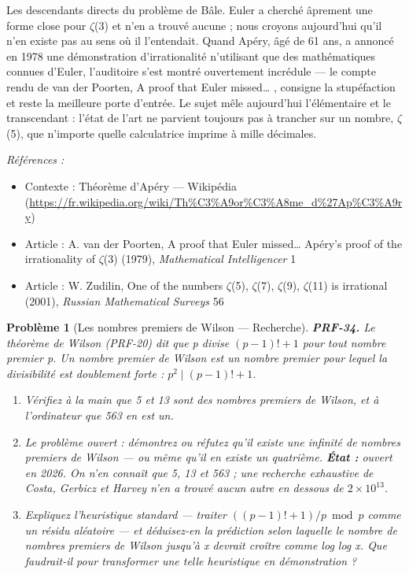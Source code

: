 \documentclass[11pt]{article}
\newtheorem{problem}{Problème}
\newenvironment{refs}{\par\small\noindent\emph{Références :}\begin{itemize}\setlength\itemsep{0pt}}{\end{itemize}\normalsize}
\begin{document}
\noindent Les descendants directs du problème de Bâle. Euler a cherché âprement une
forme close pour $\zeta$(3) et n'en a trouvé aucune ; nous croyons aujourd'hui qu'il n'en existe
pas au sens où il l'entendait. Quand Apéry, âgé de 61 ans, a annoncé en 1978 une
démonstration d'irrationalité n'utilisant que des mathématiques connues d'Euler, l'auditoire
s'est montré ouvertement incrédule --- le compte rendu de van der Poorten, \og{} A proof that
Euler missed\dots{} \fg{}, consigne la stupéfaction et reste la meilleure porte d'entrée. Le sujet mêle
aujourd'hui l'élémentaire et le transcendant : l'état de l'art ne parvient toujours pas à
trancher sur un nombre, $\zeta$(5), que n'importe quelle calculatrice imprime à mille
décimales.

\begin{refs}
\item Contexte : Théorème d'Apéry --- Wikipédia (\url{https://fr.wikipedia.org/wiki/Th%C3%A9or%C3%A8me_d%27Ap%C3%A9ry})
\item Article : A. van der Poorten, \og{} A proof that Euler missed\dots{} Apéry's proof of the irrationality of $\zeta$(3) \fg{} (1979), \textit{Mathematical Intelligencer} 1
\item Article : W. Zudilin, \og{} One of the numbers $\zeta$(5), $\zeta$(7), $\zeta$(9), $\zeta$(11) is irrational \fg{} (2001), \textit{Russian Mathematical Surveys} 56
\end{refs}

\bigskip

\begin{problem}[{Les nombres premiers de Wilson --- Recherche}]
\textbf{PRF-34.} Le théorème de Wilson (PRF-20) dit que p divise
$ (p-1)! + 1 $ pour tout nombre premier p. Un \textit{nombre premier de Wilson} est un
nombre premier pour lequel la divisibilité est doublement forte :
$ p^2 \mid (p-1)! + 1 $.
\begin{enumerate}
\item[(a)] Vérifiez à la main que 5
et 13 sont des nombres premiers de Wilson, et à l'ordinateur que 563 en est un.
\item[(b)] Le problème ouvert : démontrez
ou réfutez qu'il existe une infinité de nombres premiers de Wilson --- ou même qu'il en existe
un quatrième. \textbf{État :} ouvert en 2026. On n'en connaît que 5, 13 et 563 ; une recherche
exhaustive de Costa, Gerbicz et Harvey n'en a trouvé aucun autre en dessous de
$ 2 \times 10^{13} $.
\item[(c)] Expliquez l'heuristique standard --- traiter $ ((p-1)!+1)/p \bmod p $ comme un résidu
aléatoire --- et déduisez-en la prédiction selon laquelle le nombre de nombres premiers de
Wilson jusqu'à x devrait croître comme log log x. Que faudrait-il pour transformer une telle
heuristique en démonstration ?
\end{enumerate}

\end{problem}
\end{document}
